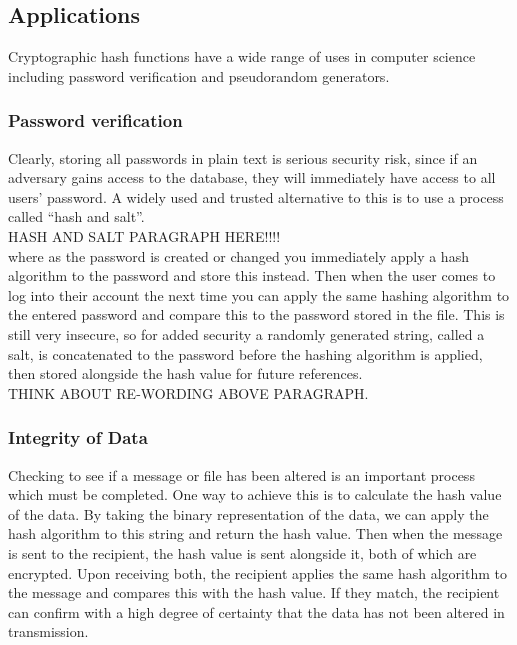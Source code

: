 \subsection{Applications}
Cryptographic hash functions have a wide range of uses in computer science including password verification and pseudorandom generators.
\subsubsection{Password verification}
Clearly, storing all passwords in plain text is serious security risk, since if an adversary gains access to the database, they will immediately have access to all users' password. A widely used and trusted alternative to this is to use a process called ``hash and salt''.
\vspace{10mm}\\
HASH AND SALT PARAGRAPH HERE!!!!
\vspace{10mm}\\
 where as the password is created or changed you immediately apply a hash algorithm to the password and store this instead. Then when the user comes to log into their account the next time you can apply the same hashing algorithm to the entered password and compare this to the password stored in the file. This is still very insecure, so for added security a randomly generated string, called a salt, is concatenated to the password before the hashing algorithm is applied, then stored alongside the hash value for future references.
\vspace{10mm}\\
THINK ABOUT RE-WORDING ABOVE PARAGRAPH.
\vspace{10mm}\\
\subsubsection{Integrity of Data}
Checking to see if a message or file has been altered is an important process which must be completed. One way to achieve this is to calculate the hash value of the data. By taking the binary representation of the data, we can apply the hash algorithm to this string and return the hash value. Then when the message is sent to the recipient, the hash value is sent alongside it, both of which are encrypted. Upon receiving both, the recipient applies the same hash algorithm to the message and compares this with the hash value. If they match, the recipient can confirm with a high degree of certainty that the data has not been altered in transmission.

